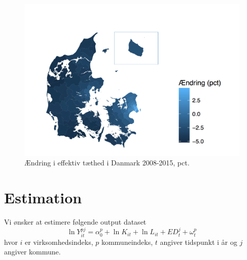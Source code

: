 \documentclass[a4paper, 12pt, titlepage]{article}
\begin{document}
\begin{figure}[tb] 
  \centering
  \includegraphics[width=\textwidth]{andring.pdf}
  \caption{Ændring i effektiv tæthed i Danmark 2008-2015, pct.}
  \label{fig:aendring}
\end{figure}

  
  
 
 
 







\section{Estimation}
Vi ønsker at estimere følgende output dataset
\begin{equation}
	\ln Y_{it}^{pj} = \alpha^p_0 + \ln K_{it} + \ln L_{it} + ED^j_{t} + \omega^p_{t}
\end{equation}
hvor $i$ er virksomhedsindeks, $p$ kommuneindeks, $t$ angiver tidspunkt i år og $j$ angiver kommune. 
\end{document}
